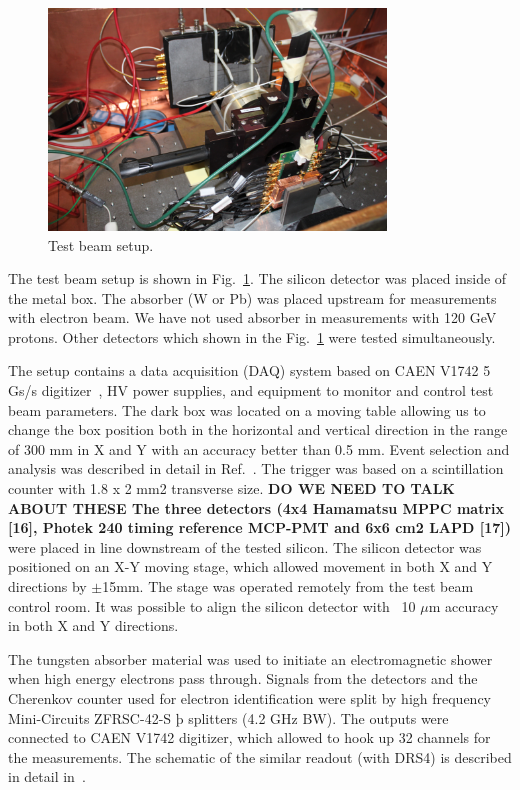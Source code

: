 \documentclass[12pt]{article}
\begin{document}
\begin{figure}[htbp] 
\centering
\includegraphics[width=0.8\textwidth]{plots/SiliconPadTestBeam.png} 
\caption{Test beam setup.} 
\label{fig:SiliconPadTBeam} 
\end{figure} 

The test beam setup is shown in Fig.~\ref{fig:SiliconPadTBeam}. The silicon
detector was placed inside of the metal box. The absorber (W or Pb) was placed
upstream for measurements with electron beam. We have not used absorber in
measurements with 120 GeV protons. Other detectors which shown in the
Fig.~\ref{fig:SiliconPadTBeam} were tested simultaneously. 

The setup contains a data acquisition (DAQ) system based on CAEN V1742 5 Gs/s
digitizer~\cite{CAENDRS}, HV power supplies, and equipment to monitor and
control test beam parameters. The dark box was located on a moving table
allowing us to change the box position both in the horizontal and vertical
direction in the range of 300 mm in X and Y with an accuracy better than 0.5 mm.
Event selection and analysis was described in detail in
Ref.~\cite{MCPFastCaloNIMA}. The trigger was based on a scintillation counter
with 1.8 x 2 mm2 transverse size. \textbf{DO WE NEED TO TALK ABOUT THESE The
three detectors (4x4 Hamamatsu MPPC matrix [16], Photek 240 timing reference
MCP-PMT and 6x6 cm2 LAPD [17])} were placed in line downstream of the tested
silicon. The silicon detector was positioned on an X-Y moving stage, which
allowed movement in both X and Y directions by $\pm$15mm. The stage was operated
remotely from the test beam control room. It was possible to align the silicon
detector with ~10 $\mu$m accuracy in both X and Y directions. 

The tungsten absorber material was used to initiate an electromagnetic shower
when high energy electrons pass through. Signals from the detectors and the
Cherenkov counter used for electron identification were split by high frequency
Mini-Circuits ZFRSC-42-S þ splitters (4.2 GHz BW). The outputs were connected to
CAEN V1742 digitizer, which allowed to hook up 32 channels for the measurements.
The schematic of the similar readout (with DRS4) is described in detail in~\cite{Anderson:2015gha}. 
\end{document}
